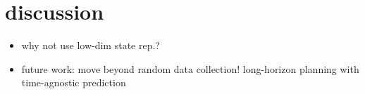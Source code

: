 \section{discussion}

\begin{itemize}
	\item why not use low-dim state rep.?
    \item future work: 
    \subitem move beyond random data collection!
    \subitem long-horizon planning with time-agnostic prediction
    
\end{itemize}